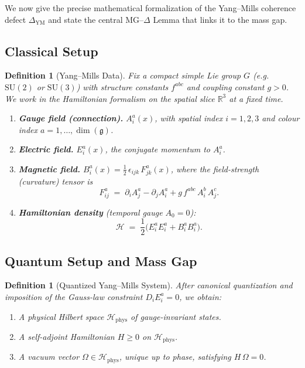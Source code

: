 \documentclass[11pt]{article}
\newtheorem{definition}[theorem]{Definition}
\begin{document}
We now give the precise mathematical formalization of the Yang--Mills
coherence defect $\Delta_{\mathrm{YM}}$ and state the central
MG--$\Delta$ Lemma that links it to the mass gap.

\subsection{Classical Setup}

\begin{definition}[Yang--Mills Data]
\label{def:ym-data}
Fix a compact simple Lie group $G$ (e.g.\ $\mathrm{SU}(2)$ or
$\mathrm{SU}(3)$) with structure constants $f^{abc}$ and coupling
constant $g > 0$.  We work in the Hamiltonian formalism on the spatial
slice $\mathbb{R}^3$ at a fixed time.

\begin{enumerate}
\item \textbf{Gauge field (connection).}
      $A_i^a(x)$, with spatial index $i = 1,2,3$ and colour index
      $a = 1,\ldots, \dim(\mathfrak{g})$.
\item \textbf{Electric field.}
      $E_i^a(x)$, the conjugate momentum to $A_i^a$.
\item \textbf{Magnetic field.}
      $B_i^a(x) = \tfrac{1}{2}\,\epsilon_{ijk}\,F_{jk}^a(x)$, where
      the field-strength (curvature) tensor is
      \[
        F_{ij}^a
        \;=\;
        \partial_i A_j^a - \partial_j A_i^a
        + g\,f^{abc}\,A_i^b\,A_j^c .
      \]
\item \textbf{Hamiltonian density} (temporal gauge $A_0 = 0$):
      \[
        \mathcal{H}
        \;=\;
        \frac{1}{2}\!\bigl(E_i^a E_i^a + B_i^a B_i^a\bigr).
      \]
\end{enumerate}
\end{definition}

\subsection{Quantum Setup and Mass Gap}

\begin{definition}[Quantized Yang--Mills System]
\label{def:ym-quantum}
After canonical quantization and imposition of the Gauss-law constraint
$D_i E_i^a = 0$, we obtain:
\begin{enumerate}
\item A \emph{physical Hilbert space} $\mathcal{H}_{\mathrm{phys}}$
      of gauge-invariant states.
\item A self-adjoint \emph{Hamiltonian}
      $H \geq 0$ on $\mathcal{H}_{\mathrm{phys}}$.
\item A \emph{vacuum vector} $\Omega \in \mathcal{H}_{\mathrm{phys}}$,
      unique up to phase, satisfying $H\,\Omega = 0$.
\end{enumerate}
\end{definition}
\end{document}
